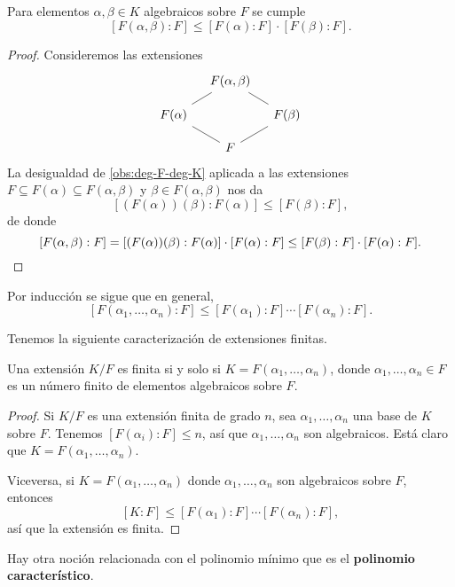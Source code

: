 \begin{proposicion}
  Para elementos $\alpha,\beta\in K$ algebraicos sobre $F$ se cumple
  $$[F (\alpha,\beta) : F] \le [F (\alpha) : F] \cdot [F (\beta) : F].$$

  \begin{proof}
    Consideremos las extensiones
    \[ \begin{tikzcd}[row sep=1em, column sep=1em]
      & F (\alpha,\beta)\ar[-]{dl}\ar[-]{dr} \\
      F (\alpha)\ar[-]{dr} & & F (\beta)\ar[-]{dl} \\
      & F
    \end{tikzcd} \]
    La desigualdad de \ref{obs:deg-F-deg-K} aplicada a las extensiones
    $F \subseteq F (\alpha) \subseteq F (\alpha,\beta)$ y
    $\beta \in F (\alpha,\beta)$ nos da
    $$[(F (\alpha)) (\beta) : F (\alpha)] \le [F (\beta) : F],$$
    de donde
    \[ [F (\alpha,\beta) : F] =
       [(F (\alpha)) (\beta) : F (\alpha)] \cdot [F (\alpha) : F] \le
       [F (\beta) : F] \cdot [F (\alpha) : F]. \qedhere \]
  \end{proof}
\end{proposicion}

Por inducción se sigue que en general,
\[ [F (\alpha_1,\ldots,\alpha_n) : F] \le
   [F (\alpha_1) : F]\cdots [F (\alpha_n) : F]. \]

Tenemos la siguiente caracterización de extensiones finitas.

\begin{proposicion}
  Una extensión $K/F$ es finita si y solo si $K = F (\alpha_1,\ldots,\alpha_n)$,
  donde $\alpha_1,\ldots,\alpha_n \in F$ es un número finito de elementos
  algebraicos sobre $F$.

  \begin{proof}
    Si $K/F$ es una extensión finita de grado $n$, sea
    $\alpha_1, \ldots, \alpha_n$ una base de $K$ sobre $F$. Tenemos
    $[F (\alpha_i) : F] \le n$, así que $\alpha_1,\ldots,\alpha_n$ son
    algebraicos. Está claro que $K = F (\alpha_1,\ldots,\alpha_n)$.

    Viceversa, si $K = F (\alpha_1,\ldots,\alpha_n)$ donde
    $\alpha_1,\ldots,\alpha_n$ son algebraicos sobre $F$, entonces
    $$[K : F] \le [F (\alpha_1) : F] \cdots [F (\alpha_n) : F],$$
    así que la extensión es finita.
  \end{proof}
\end{proposicion}

Hay otra noción relacionada con el polinomio mínimo que es el
\textbf{polinomio característico}.

